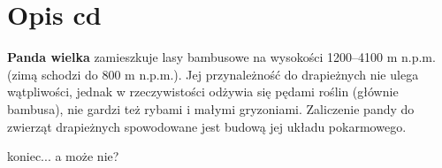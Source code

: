 \section*{Opis cd}
{\bf Panda wielka} zamieszkuje lasy bambusowe na wysokości 1200–4100 m n.p.m. (zimą schodzi do 800 m n.p.m.). Jej przynależność do drapieżnych nie ulega wątpliwości, jednak w rzeczywistości odżywia się pędami roślin (głównie bambusa), nie gardzi też rybami i małymi gryzoniami. Zaliczenie pandy do zwierząt drapieżnych spowodowane jest budową jej układu pokarmowego.

\vspace{2em}
koniec... a może nie?